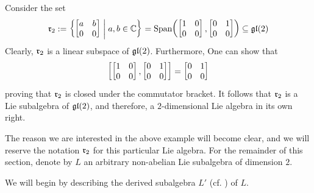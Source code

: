 \begin{boxexample}\label{Ch1:Eg:2D_NonAbelian_Lie_Algebra}
    Consider the set
    \begin{align*}
        \mathfrak{r}_2 := \left\{ 
            \begin{bmatrix}
                a & b \\ 0 & 0
            \end{bmatrix}
         \; \middle\vert \; a, b \in \mathbb{C} \right\}
        = \operatorname{Span}\!\left( \begin{bmatrix} 1 & 0 \\ 0 & 0 \end{bmatrix}, \begin{bmatrix} 0 & 1 \\ 0 & 0 \end{bmatrix} \right)
        \subseteq \mathfrak{gl}\!\left( 2 \right)
    \end{align*}
    Clearly, $\mathfrak{r}_2$ is a linear subspace of $\mathfrak{gl}\!\left( 2 \right)$. Furthermore, One can show that
    \begin{align*}
        \left[ 
            \begin{bmatrix} 1 & 0 \\ 0 & 0 \end{bmatrix}, \begin{bmatrix} 0 & 1 \\ 0 & 0 \end{bmatrix}
         \right] = \begin{bmatrix} 0 & 1 \\ 0 & 0 \end{bmatrix}
    \end{align*}
    proving that $\mathfrak{r}_2$ is closed under the commutator bracket. It follows that $\mathfrak{r}_2$ is a Lie subalgebra of $\mathfrak{gl}\!\left( 2 \right)$, and therefore, a $2$-dimensional Lie algebra in its own right.
\end{boxexample}


The reason we are interested in the above example will become clear, and we will reserve the notation $\mathfrak{r}_2$ for this particular Lie algebra. For the remainder of this section, denote by $L$ an arbitrary non-abelian Lie subalgebra of dimension $2$.

We will begin by describing the derived subalgebra $L'$ (cf. ) of $L$.

